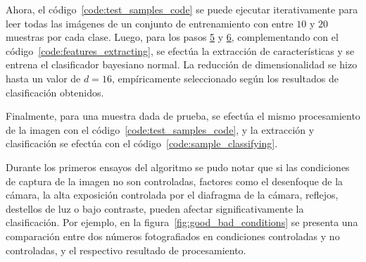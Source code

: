 Ahora, el código~\ref{code:test_samples_code} se puede ejecutar iterativamente para leer todas las imágenes de un conjunto de entrenamiento con entre $10$ y $20$ muestras por cada clase.
Luego, para los pasos \hyperref[sec:kpca_reduction]{5} y \hyperref[sec:nb_classifier]{6}, complementando con el código~\ref{code:features_extracting}, se efectúa la extracción de características y se entrena el clasificador bayesiano normal.
La reducción de dimensionalidad se hizo hasta un valor de $d = 16$, empíricamente seleccionado según los resultados de clasificación obtenidos.

Finalmente, para una muestra dada de prueba, se efectúa el mismo procesamiento de la imagen con el código~\ref{code:test_samples_code}, y la extracción y clasificación se efectúa con el código~\ref{code:sample_classifying}.

Durante los primeros ensayos del algoritmo se pudo notar que si las condiciones de captura de la imagen no son controladas, factores como el desenfoque de la cámara, la alta exposición controlada por el diafragma de la cámara, reflejos, destellos de luz o bajo contraste, pueden afectar significativamente la clasificación.
Por ejemplo, en la figura~\ref{fig:good_bad_conditions} se presenta una comparación entre dos números fotografiados en condiciones controladas y no controladas, y el respectivo resultado de procesamiento.


